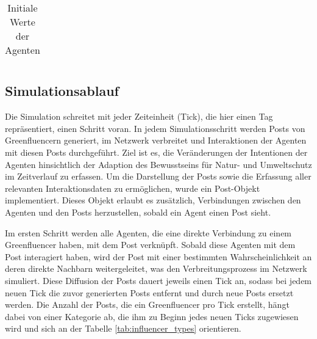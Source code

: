 \documentclass[runningheads]{llncs}
\begin{document}
\begin{table}[H]
\begin{tabular}{|l|l|l|}
\end{tabular}
\caption{Initiale Werte der Agenten}
  \label{tab:turtle_vars}
\end{table}

\subsection{Simulationsablauf}
Die Simulation schreitet mit jeder Zeiteinheit (Tick), die hier einen Tag repräsentiert, einen Schritt voran. In jedem Simulationsschritt werden Posts von Greenfluencern generiert, im Netzwerk verbreitet und Interaktionen der Agenten mit diesen Posts durchgeführt. Ziel ist es, die Veränderungen der Intentionen der Agenten hinsichtlich der Adaption des Bewusstseins für Natur- und Umweltschutz im Zeitverlauf zu erfassen. Um die Darstellung der Posts sowie die Erfassung aller relevanten Interaktionsdaten zu ermöglichen, wurde ein Post-Objekt implementiert. Dieses Objekt erlaubt es zusätzlich, Verbindungen zwischen den Agenten und den Posts herzustellen, sobald ein Agent einen Post sieht.

Im ersten Schritt werden alle Agenten, die eine direkte Verbindung zu einem Greenfluencer haben, mit dem Post verknüpft. Sobald diese Agenten mit dem Post interagiert haben, wird der Post mit einer bestimmten Wahrscheinlichkeit an deren direkte Nachbarn weitergeleitet, was den Verbreitungsprozess im Netzwerk simuliert. Diese Diffusion der Posts dauert jeweils einen Tick an, sodass bei jedem neuen Tick die zuvor generierten Posts entfernt und durch neue Posts ersetzt werden. Die Anzahl der Posts, die ein Greenfluencer pro Tick erstellt, hängt dabei von einer Kategorie ab, die ihm zu Beginn jedes neuen Ticks zugewiesen wird und sich an der Tabelle \ref{tab:influencer_types} orientieren. 
\end{document}
